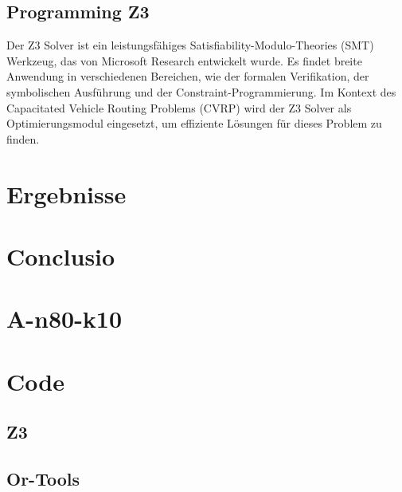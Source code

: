 \documentclass{IEEEtran}
\begin{document}
\subsection{Programming Z3}
Der Z3 Solver ist ein leistungsfähiges Satisfiability-Modulo-Theories (SMT) Werkzeug, 
das von Microsoft Research entwickelt wurde. Es findet breite Anwendung in verschiedenen 
Bereichen, wie der formalen Verifikation, der symbolischen Ausführung und der 
Constraint-Programmierung. Im Kontext des Capacitated Vehicle Routing Problems (CVRP) wird
der Z3 Solver als Optimierungsmodul eingesetzt, um effiziente Lösungen für dieses Problem
zu finden.

\section{Ergebnisse}


\section{Conclusio}

\printbibliography


\appendix
\section{A-n80-k10}


\section{Code}
\subsection{Z3}
\subsection{Or-Tools}
\end{document}

